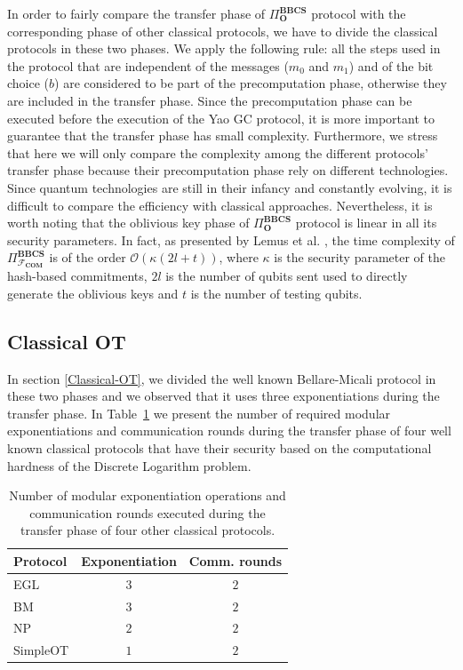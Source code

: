 In order to fairly compare the transfer phase of $\Pi^{\textbf{BBCS}}_{\textbf{O}}$ protocol with the corresponding phase of other classical protocols, we have to divide the classical protocols in these two phases. We apply the following rule: all the steps used in the protocol that are independent of the messages ($m_0$ and $m_1$) and of the bit choice ($b$) are considered to be part of the precomputation phase, otherwise they are included in the transfer phase. Since the precomputation phase can be executed before the execution of the Yao GC protocol, it is more important to guarantee that the transfer phase has small complexity. Furthermore, we stress that here we will only compare the complexity among the different protocols' transfer phase because their precomputation phase rely on different technologies. Since quantum technologies are still in their infancy and constantly evolving, it is difficult to compare the efficiency with classical approaches. Nevertheless, it is worth noting that the oblivious key phase of $\Pi^{\textbf{BBCS}}_{\textbf{O}}$ protocol is linear in all its security parameters. In fact, as presented by Lemus et al. \cite{Lemus20}, the time complexity of $\Pi^{\textbf{BBCS}}_{\mathcal{F}_{\textbf{COM}}}$ is of the order $\mathcal{O}(\kappa(2l + t))$, where $\kappa$ is the security parameter of the hash-based commitments, $2l$ is the number of qubits sent used to directly generate the oblivious keys and $t$ is the number of testing qubits.

\subsection{Classical OT} \label{C-OT_comp}

In section \ref{Classical-OT}, we divided the well known Bellare-Micali protocol in these two phases and we observed that it uses three exponentiations during the transfer phase. In Table~\ref{table:ClassicalOT_comparison} we present the number of required modular exponentiations and communication rounds during the transfer phase of four well known classical protocols that have their security based on the computational hardness of the Discrete Logarithm problem. 

\begin{table}[h!]
\centering
\begin{tabular}{lcc}
\toprule
Protocol & Exponentiation & Comm. rounds \\
\midrule
EGL \cite{EGL85}      & $3$              & $2$\\ 
BM  \cite{BM89}     & $3$              & $2$ \\ 
NP  \cite{NP01}     & $2$             & $2$  \\ 
SimpleOT \cite{CO15} & $1$              & $2$           \\
\bottomrule
\end{tabular}
\caption{Number of modular exponentiation operations and communication rounds executed during the transfer phase of four other classical protocols.}
\label{table:ClassicalOT_comparison}
\end{table}

